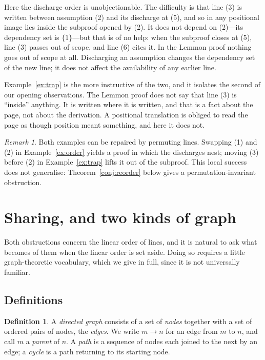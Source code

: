 \documentclass[11pt]{article}
\theoremstyle{plain}
\theoremstyle{definition}
\newtheorem{definition}[theorem]{Definition}
\theoremstyle{remark}
\newtheorem{remark}[theorem]{Remark}
\begin{document}
\noindent Here the discharge order is unobjectionable. The difficulty is that
line (3) is written between assumption (2) and its discharge at (5), and so in
any positional image lies inside the subproof opened by (2). It does not
depend on (2)---its dependency set is $\{1\}$---but that is of no help: when
the subproof closes at (5), line (3) passes out of scope, and line (6) cites
it. In the Lemmon proof nothing goes out of scope at all. Discharging an
assumption changes the dependency set of the new line; it does not affect the
availability of any earlier line.

Example~\ref{ex:trap} is the more instructive of the two, and it isolates the
second of our opening observations. The Lemmon proof does not say that line
(3) is ``inside'' anything. It is written where it is written, and that is a
fact about the page, not about the derivation. A positional translation is
obliged to read the page as though position meant something, and here it does
not.

\begin{remark}
Both examples can be repaired by permuting lines. Swapping (1) and (2) in
Example~\ref{ex:order} yields a proof in which the discharges nest; moving (3)
before (2) in Example~\ref{ex:trap} lifts it out of the subproof. This local
success does not generalise: Theorem~\ref{conj:reorder} below gives a
permutation-invariant obstruction.
\end{remark}

\section{Sharing, and two kinds of graph}\label{sec:trees}

Both obstructions concern the linear order of lines, and it is natural to ask
what becomes of them when the linear order is set aside. Doing so requires a
little graph-theoretic vocabulary, which we give in full, since it is not
universally familiar.

\subsection{Definitions}

\begin{definition}
A \emph{directed graph} consists of a set of \emph{nodes} together with a set
of ordered pairs of nodes, the \emph{edges}. We write $m \to n$ for an edge
from $m$ to $n$, and call $m$ a \emph{parent} of $n$. A \emph{path} is a
sequence of nodes each joined to the next by an edge; a \emph{cycle} is a path
returning to its starting node.
\end{definition}
\end{document}
